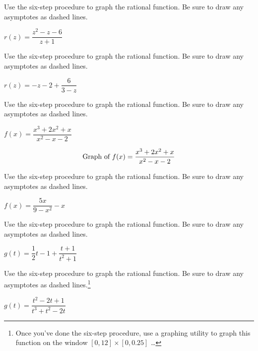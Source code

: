 \documentclass{ximera}
\begin{document}
\begin{problem}
Use the six-step procedure
to graph the rational function.  Be sure to draw any asymptotes as dashed lines.

$r(z) = \dfrac{z^2-z-6}{z+1}$
\end{problem}  

\begin{problem}
Use the six-step procedure
to graph the rational function.  Be sure to draw any asymptotes as dashed lines.

$r(z) =-z-2+\dfrac{6}{3-z}$
\end{problem} 

\begin{problem}
Use the six-step procedure
to graph the rational function.  Be sure to draw any asymptotes as dashed lines.

$f(x) = \dfrac{x^3+2x^2+x}{x^2-x-2}$

\begin{solution}
\[
\graph[xmin=-7, xmax=5, ymin=-5, ymax=5,panel]{f(x) = \dfrac{x^3+2x^2+x}{x^2-x-2}}
\]
\end{solution}
\end{problem}  

\begin{problem}
Use the six-step procedure
to graph the rational function.  Be sure to draw any asymptotes as dashed lines.

$f(x) = \dfrac{5x}{9-x^2} - x$
\end{problem}   

\begin{problem}
Use the six-step procedure
to graph the rational function.  Be sure to draw any asymptotes as dashed lines.

$g(t) =\dfrac{1}{2}t-1 + \dfrac{t+1}{t^2+1}$
\end{problem} 

\begin{problem}\label{sixsteplast}
Use the six-step procedure
to graph the rational function.  Be sure to draw any asymptotes as dashed lines.\footnote{Once you've done the six-step procedure, use a graphing utility to graph this function on the window $[0, 12] \times [0, 0.25]$ \ldots}

$g(t) = \dfrac{t^{2} - 2t + 1}{t^{3} + t^{2} - 2t}$ 
\end{problem} 
\end{document}
